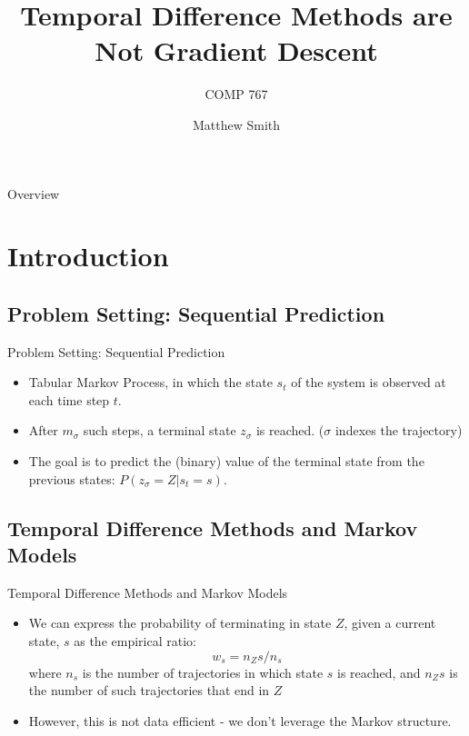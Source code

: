 \documentclass{beamer}
\title{Temporal Difference Methods are Not Gradient Descent}
\subtitle{COMP 767}
\author{Matthew Smith}
\date{}
\institute{Summary of: \emph{Temporal Difference Methods and Markov Models} by Etienne Barnard}
\begin{document}
\begin{frame}
  \titlepage
\end{frame}




\begin{frame}{Overview}

\tableofcontents
\end{frame}

\section{Introduction}
\subsection{Problem Setting: Sequential Prediction}
\begin{frame}{Problem Setting: Sequential Prediction}

\begin{itemize}
\item Tabular Markov Process, in which the state $s_t$ of the system is observed at each time step $t$. 
\item After $m_\sigma$ such steps, a terminal state $z_\sigma$
is reached. ($\sigma$ indexes the trajectory)
\item The goal is to predict the (binary) value of the terminal state from the previous states: $P(z_\sigma = Z | s_t = s )$.
\end{itemize}

\end{frame}

\subsection{Temporal Difference Methods and Markov Models}
\begin{frame}{Temporal Difference Methods and Markov Models}

\begin{itemize}
  \item<1-> We can express the probability of terminating in state $Z$, given a current state, $s$ as the empirical ratio:
  \[w_s = n_Zs / n_s\]
  where $n_s$ is the number of trajectories in which state $s$ is reached, and $n_Zs$ is the number of such trajectories that end in $Z$
  \item<2-> However, this is not data efficient - we don't leverage the Markov structure.

\end{itemize}


\end{frame}
\end{document}
